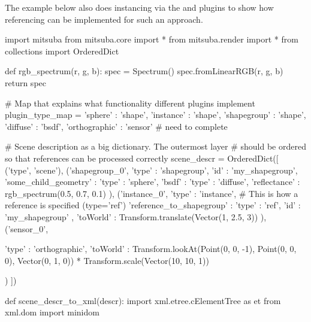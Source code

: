 The example below also does instancing via the 
and  plugins to show how referencing can be implemented
for such an approach.
\begin{python}
import mitsuba
from mitsuba.core import *
from mitsuba.render import *
from collections import OrderedDict

def rgb_spectrum(r, g, b):
    spec = Spectrum()
    spec.fromLinearRGB(r, g, b)
    return spec

# Map that explains what functionality different plugins implement
plugin_type_map ={
    'sphere' : 'shape',
    'instance' : 'shape',
    'shapegroup' : 'shape',
    'diffuse' : 'bsdf',
    'orthographic' : 'sensor' # need to complete
}

# Scene description as a big dictionary. The outermost layer
# should be ordered so that references can be processed correctly
scene_descr = OrderedDict([
    ('type', 'scene'),
    ('shapegroup_0', {
        'type' : 'shapegroup',
        'id' : 'my_shapegroup',
        'some_child_geometry' : {
            'type' : 'sphere',
            'bsdf' : {
                'type' : 'diffuse',
                'reflectance' : rgb_spectrum(0.5, 0.7, 0.1)
            }
        }
    }),
    ('instance_0', {
        'type' : 'instance',
        # This is how a reference is specified (type='ref')
        'reference_to_shapegroup' : {
            'type' : 'ref',
            'id' : 'my_shapegroup'
        },
        'toWorld' : Transform.translate(Vector(1, 2.5, 3))
    }),
    ('sensor_0', {
        'type' : 'orthographic',
        'toWorld' : Transform.lookAt(Point(0, 0, -1),
            Point(0, 0, 0), Vector(0, 1, 0)) * Transform.scale(Vector(10, 10, 1))

    })
])

def scene_descr_to_xml(descr):
    import xml.etree.cElementTree as et
    from xml.dom import minidom


\end{python}
